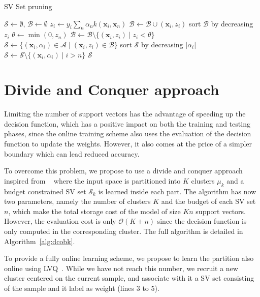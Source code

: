 \documentclass[10pt,final,a4paper]{article}
\newcommand{\x}{\mathbf{x}}
\newcommand{\Acal}{\mathcal{A}}
\newcommand{\Bcal}{\mathcal{B}}
\newcommand{\Scal}{\mathcal{S}}
\begin{document}
\begin{algorithm}[H]
\caption{SV Set pruning}
\label{alg:pruning}
\begin{algorithmic}[1]
\Function{prune}{$\Acal = \{ (\x_i, \alpha_i) \}$, $n$}
\State $\Scal \leftarrow \emptyset$, $\Bcal \leftarrow \emptyset$
\For{$i=0$ to $\vert \Acal \vert$}
\State \Call{update}{$\Acal$, $\x_i$, $y_i$}
\State $z_i \leftarrow  y_i\sum_n\alpha_nk(\x_i, \x_n)$
\State $\Bcal \leftarrow \Bcal \cup (\x_i, z_i)$
\EndIf
\EndFor
\If{$\vert\Bcal\vert > n$}
\State sort $\Bcal$ by decreasing $z_i$
\State $\theta \leftarrow \min(0, z_n)$
\State $\Bcal \leftarrow \Bcal \setminus \{ (\x_i, z_i) \mid z_i < \theta \} $
\EndIf
\State $\Scal \leftarrow \{(\x_i, \alpha_i) \in \Acal \mid (\x_i, z_i) \in \Bcal \}$
\If{$\vert \Scal  \vert > n$}
\State sort $\Scal$ by decreasing $\vert \alpha_i \vert$
\State $\Scal \leftarrow \Scal \setminus \{ (\x_i, \alpha_i) \mid i > n \} $
\EndIf
\State \Return $\Scal$
\EndFunction
\end{algorithmic}
\end{algorithm}

\section{Divide and Conquer approach}
\label{sec:dc}

Limiting the number of support vectors has the advantage of speeding up the decision function, which has a positive impact on both the training and testing phases, since the online training scheme also uses the evaluation of the decision function to update the weights.
However, it also comes at the price of a simpler boundary which can lead reduced accuracy.

To overcome this problem, we propose to use a divide and conquer approach inspired from ~\cite{hsieh14nips} where the input space is partitioned into $K$ clusters $\mu_k$ and a budget constrained SV set $\Scal_k$ is learned inside each part.
The algorithm has now two parameters, namely the number of clusters $K$ and the budget of each SV set $n$, which make the total storage cost of the model of size $Kn$ support vectors.
However, the evaluation cost is only $\mathcal{O}(K+n)$ since the decision function is only computed in the corresponding cluster.
The full algorithm is detailed in Algorithm~\ref{alg:dcobk}.

To provide a fully online learning scheme, we propose to learn the partition also online using LVQ~\cite{kohonen95lvq}.
While we have not reach this number, we recruit a new cluster centered on the current sample, and associate with it a SV set consisting of the sample and it label as weight (lines 3 to 5).
\end{document}
